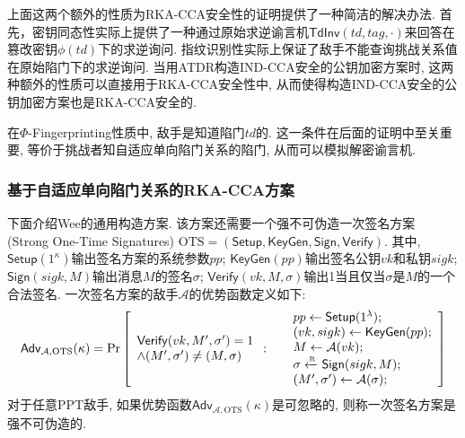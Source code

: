 \begin{note}
上面这两个额外的性质为RKA-CCA安全性的证明提供了一种简洁的解决办法. 首先，密钥同态性实际上提供了一种通过原始求逆谕言机$\mathsf{TdInv}(td, tag, \cdot)$来回答在篡改密钥$\phi(td)$下的求逆询问. 指纹识别性实际上保证了敌手不能查询挑战关系值在原始陷门下的求逆询问. 当用ATDR构造IND-CCA安全的公钥加密方案时, 这两种额外的性质可以直接用于RKA-CCA安全性中, 从而使得构造IND-CCA安全的公钥加密方案也是RKA-CCA安全的. 
\end{note}

\begin{note}
在$\Phi$-Fingerprinting性质中, 敌手是知道陷门$td$的. 这一条件在后面的证明中至关重要, 等价于挑战者知自适应单向陷门关系的陷门, 从而可以模拟解密谕言机.
\end{note}

\subsubsection{基于自适应单向陷门关系的RKA-CCA方案}
下面介绍Wee的通用构造方案. 该方案还需要一个强不可伪造一次签名方案 (Strong One-Time Signatures) $\text{OTS} = (\mathsf{Setup}, \mathsf{KeyGen}, \mathsf{Sign}, \mathsf{Verify})$. 其中, $\mathsf{Setup}(1^\kappa)$输出签名方案的系统参数$pp$; $\mathsf{KeyGen}(pp)$输出签名公钥$vk$和私钥$sigk$; $\mathsf{Sign}(sigk, M)$输出消息$M$的签名$\sigma$; $\mathsf{Verify}(vk, M, \sigma)$输出1当且仅当$\sigma$是$M$的一个合法签名. 一次签名方案的敌手$\mathcal{A}$的优势函数定义如下:
\begin{displaymath}
	\mathsf{Adv}_{\mathcal{A}, \text{OTS}}(\kappa) = \Pr \left[ 
\begin{array}{l}
\mathsf{Verify}(vk, M', \sigma') = 1\\
\land (M', \sigma') \neq (M, \sigma)
\end{array}
:~
	\begin{array}{ll}
		& pp \leftarrow \mathsf{Setup}(1^\lambda); \\
		& (vk, sigk) \leftarrow \mathsf{KeyGen}(pp);\\
		& M \leftarrow \mathcal{A}(vk);\\
		& \sigma \xleftarrow{\textup{\tiny R}} \mathsf{Sign}(sigk, M); \\
		& (M', \sigma') \leftarrow \mathcal{A}(\sigma);
	\end{array} 
\right]
\end{displaymath}
对于任意PPT敌手, 如果优势函数$\mathsf{Adv}_{\mathcal{A}, \text{OTS}}(\kappa)$是可忽略的, 则称一次签名方案是强不可伪造的.

